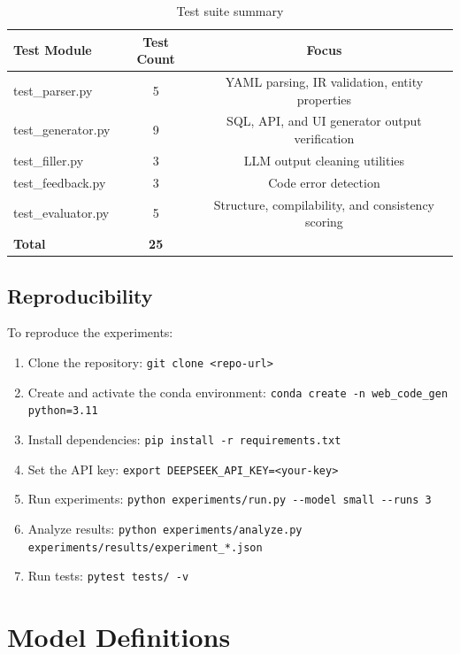 \documentclass[11pt,a4paper]{article}
\begin{document}
\begin{table}[H]
\centering
\caption{Test suite summary}
\label{tab:tests}
\begin{tabular}{lcc}
\toprule
\textbf{Test Module} & \textbf{Test Count} & \textbf{Focus} \\
\midrule
test\_parser.py     & 5  & YAML parsing, IR validation, entity properties \\
test\_generator.py   & 9  & SQL, API, and UI generator output verification \\
test\_filler.py     & 3  & LLM output cleaning utilities \\
test\_feedback.py   & 3  & Code error detection \\
test\_evaluator.py  & 5  & Structure, compilability, and consistency scoring \\
\midrule
\textbf{Total}     & \textbf{25} & \\
\bottomrule
\end{tabular}
\end{table}

\subsection{Reproducibility}

To reproduce the experiments:

\begin{enumerate}[leftmargin=*]
    \item Clone the repository: {\lstinline|git clone <repo-url>|}
    \item Create and activate the conda environment: {\lstinline|conda create -n web_code_gen python=3.11|}
    \item Install dependencies: {\lstinline|pip install -r requirements.txt|}
    \item Set the API key: {\lstinline|export DEEPSEEK_API_KEY=<your-key>|}
    \item Run experiments: {\lstinline|python experiments/run.py --model small --runs 3|}
    \item Analyze results: {\lstinline|python experiments/analyze.py experiments/results/experiment_*.json|}
    \item Run tests: {\lstinline|pytest tests/ -v|}
\end{enumerate}

\newpage
\section{Model Definitions}
\label{sec:appendix-models}
\end{document}
